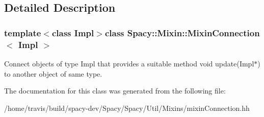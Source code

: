 \subsection{\-Detailed \-Description}
\subsubsection*{template$<$class \-Impl$>$class Spacy\-::\-Mixin\-::\-Mixin\-Connection$<$ Impl $>$}

\-Connect objects of type \-Impl that provides a suitable method void update(\-Impl$\ast$) to another object of same type. 

\-The documentation for this class was generated from the following file\-:\begin{DoxyCompactItemize}
\item 
/home/travis/build/spacy-\/dev/\-Spacy/\-Spacy/\-Util/\-Mixins/mixin\-Connection.\-hh\end{DoxyCompactItemize}
